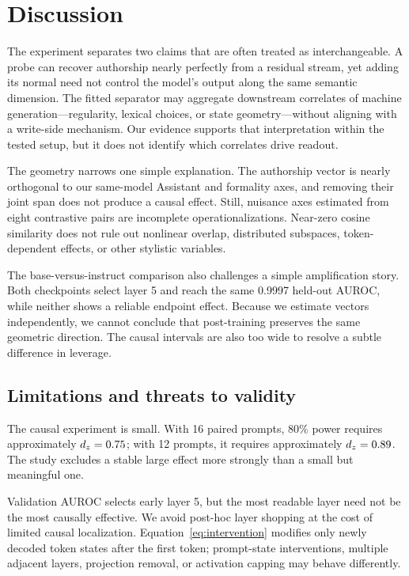 \section{Discussion}
\label{sec:discussion}

 The experiment separates two claims that are often treated as interchangeable. A probe can recover authorship nearly perfectly from a residual stream, yet adding its normal need not control the model's output along the same semantic dimension. The fitted separator may aggregate downstream correlates of machine generation---regularity, lexical choices, or state geometry---without aligning with a write-side mechanism. Our evidence supports that interpretation within the tested setup, but it does not identify which correlates drive readout.

The geometry narrows one simple explanation. The authorship vector is nearly orthogonal to our same-model Assistant and formality axes, and removing their joint span does not produce a causal effect. Still, nuisance axes estimated from eight contrastive pairs are incomplete operationalizations. Near-zero cosine similarity does not rule out nonlinear overlap, distributed subspaces, token-dependent effects, or other stylistic variables.

The base-versus-instruct comparison also challenges a simple amplification story. Both checkpoints select layer 5 and reach the same 0.9997 held-out AUROC, while neither shows a reliable endpoint effect. Because we estimate vectors independently, we cannot conclude that post-training preserves the same geometric direction. The causal intervals are also too wide to resolve a subtle difference in leverage.

\subsection{Limitations and threats to validity}

 The causal experiment is small. With 16 paired prompts, 80\% power requires approximately $d_z=0.75$; with 12 prompts, it requires approximately $d_z=0.89$. The study excludes a stable large effect more strongly than a small but meaningful one.

 Validation AUROC selects early layer 5, but the most readable layer need not be the most causally effective. We avoid post-hoc layer shopping at the cost of limited causal localization. Equation~\ref{eq:intervention} modifies only newly decoded token states after the first token; prompt-state interventions, multiple adjacent layers, projection removal, or activation capping may behave differently.

